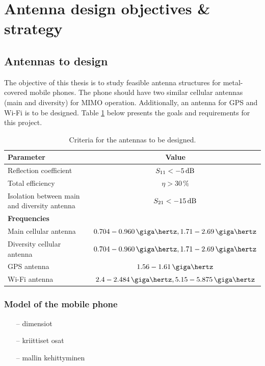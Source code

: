 \section{Antenna design objectives \& strategy}
\label{sec:ojectives}

\subsection{Antennas to design}
The objective of this thesis is to study feasible antenna structures for metal-covered mobile phones. The phone should have two similar cellular antennas (main and diversity) for MIMO operation. Additionally, an antenna for GPS and Wi-Fi is to be designed. Table \ref{tab:design_goals} below presents the goals and requirements for this project.

\begin{table}[H]
    \centering
    \caption{Criteria for the antennas to be designed.}
    \label{tab:design_goals}
    \begin{tabular}{|l|c|}
        \hline
         \textbf{Parameter} & \textbf{Value} \\
         \hline
         Reflection coefficient & $S_{11} < -5\,\mathrm{dB}$\\
         \hline
         Total efficiency & $\eta > 30\,\%$\\
         \hline
         Isolation between main and diversity antenna & $S_{21} < -15\,\mathrm{dB}$\\
         \hline\hline
         \textbf{Frequencies} & \\
         \hline
         Main cellular antenna & $0.704-0.960\,\giga\hertz, 1.71-2.69\,\giga\hertz$\\
         \hline
         Diversity cellular antenna & $0.704-0.960\,\giga\hertz, 1.71-2.69\,\giga\hertz$\\
         \hline
         GPS antenna & $1.56-1.61\,\giga\hertz$\\
         \hline
         Wi-Fi antenna & $2.4-2.484\,\giga\hertz, 5.15-5.875\,\giga\hertz$\\
         \hline
    \end{tabular}
\end{table}

\subsubsection{Model of the mobile phone}
\label{sec:phone}
\begin{itemize}
\item[--]dimensiot
\item[--]kriittiset osat
\item[--]mallin kehittyminen
\end{itemize}

